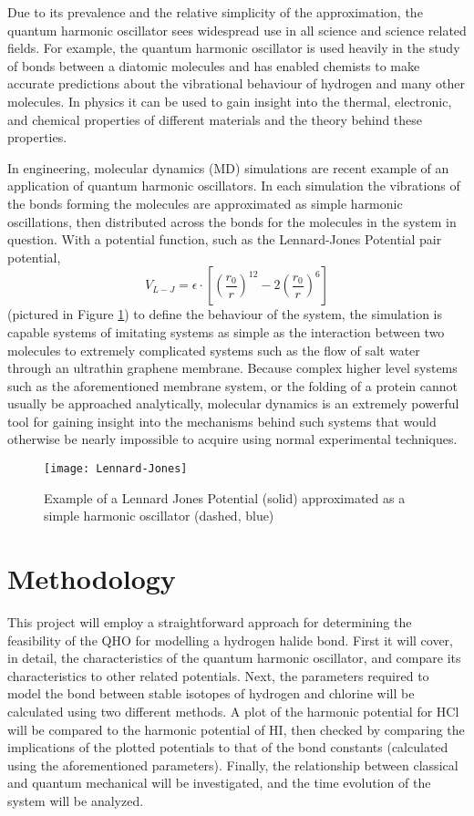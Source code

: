 \documentclass[11pt]{article}
\begin{document}
Due to its prevalence and the relative simplicity of the approximation, the quantum harmonic oscillator sees widespread use in all science and science related fields. For example, the quantum harmonic oscillator is used heavily in the study of bonds between a diatomic molecules and has enabled chemists to make accurate predictions about the vibrational behaviour of hydrogen and many other molecules. In physics it can be used to gain insight into the thermal, electronic, and chemical properties of different materials and the theory behind these properties. 

In engineering, molecular dynamics (MD) simulations are recent example of an application of quantum harmonic oscillators. In each simulation the vibrations of the bonds forming the molecules are approximated as simple harmonic oscillations, then distributed across the bonds for the molecules in the system in question. With a potential function, such as the Lennard-Jones Potential pair potential,
\begin{equation}
V_{L-J}=\epsilon\cdot\left[\left(\frac{r_0}{r}\right)^{12}-2\left(\frac{r_0}{r}\right)^6 \right]
\end{equation}
(pictured in Figure \ref{fig:LJP}) to define the behaviour of the system, the simulation is capable systems of imitating systems as simple as the interaction between two molecules to extremely complicated systems such as the flow of salt water through an ultrathin graphene membrane. Because complex higher level systems such as the aforementioned membrane system, or the folding of a protein cannot usually be approached analytically, molecular dynamics is an extremely powerful tool for gaining insight into the mechanisms behind such systems that would otherwise be nearly impossible to acquire using normal experimental techniques.

\begin{figure}[h]
\begin{center}
\texttt{[image: Lennard-Jones]}
\caption[L-J Potential]{ Example of a Lennard Jones Potential (solid) approximated as a simple harmonic oscillator (dashed, blue) \cite{RefWorks:1}}
\label{fig:LJP}
\end{center}
\end{figure}

\section{Methodology}
This project will employ a straightforward approach for determining the feasibility of the QHO for modelling a hydrogen halide bond. First it will cover, in detail, the characteristics of the quantum harmonic oscillator, and compare its characteristics to other related potentials. Next, the parameters required to model the bond between stable isotopes of hydrogen and chlorine will be calculated using two different methods. A plot of the harmonic potential for HCl will be compared to the harmonic potential of HI, then checked by comparing the implications of the plotted potentials to that of the bond constants (calculated using the aforementioned parameters). Finally, the relationship between classical and quantum mechanical will be investigated, and the time evolution of the system will be analyzed.
\newpage
\end{document}

